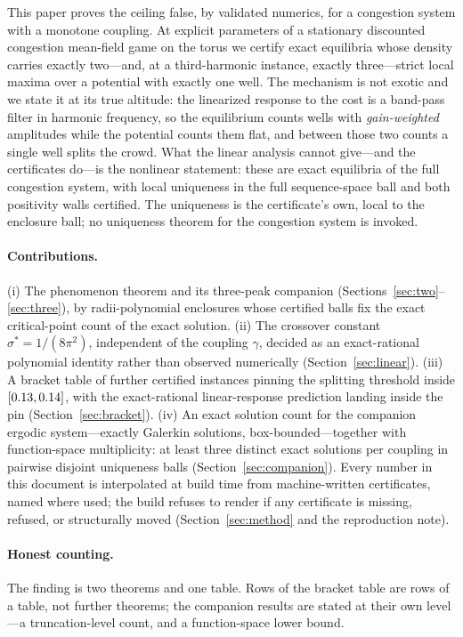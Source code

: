 \documentclass[11pt]{article}
\begin{document}
This paper proves the ceiling false, by validated numerics, for a congestion
system with a monotone coupling. At explicit parameters of a stationary
discounted congestion mean-field game on the torus we certify exact equilibria
whose density carries exactly two---and, at a third-harmonic instance, exactly
three---strict local maxima over a potential with exactly one well. The
mechanism is not exotic and we state it at its true altitude: the linearized
response to the cost is a band-pass filter in harmonic frequency, so the
equilibrium counts wells with \emph{gain-weighted} amplitudes while the
potential counts them flat, and between those two counts a single well splits
the crowd. What the linear analysis cannot give---and the certificates do---is
the nonlinear statement: these are exact equilibria of the full congestion
system, with local uniqueness in the full sequence-space ball and both
positivity walls certified. The uniqueness is the certificate's own, local to
the enclosure ball; no uniqueness theorem for the congestion system is invoked.

\paragraph{Contributions.}
(i) The phenomenon theorem and its three-peak companion
(Sections~\ref{sec:two}--\ref{sec:three}), by radii-polynomial enclosures whose
certified balls fix the exact critical-point count of the exact solution.
(ii) The crossover constant $\sigma^*=1/(8\pi^2)$, independent of the coupling
$\gamma$, decided as an exact-rational polynomial identity rather than observed
numerically (Section~\ref{sec:linear}). (iii) A bracket table of
\NumBracketRows{} further certified instances pinning the splitting threshold
inside $[0.13,0.14]$, with the exact-rational linear-response prediction
landing inside the pin (Section~\ref{sec:bracket}). (iv) An exact solution
count for the companion ergodic system---exactly \CensusCount{} Galerkin
solutions, box-bounded---together with function-space multiplicity: at least
three distinct exact solutions per coupling in pairwise disjoint uniqueness
balls (Section~\ref{sec:companion}). Every number in this document is
interpolated at build time from machine-written certificates, named where
used; the build refuses to render if any certificate is missing, refused, or
structurally moved (Section~\ref{sec:method} and the reproduction note).

\paragraph{Honest counting.}
The finding is two theorems and one table. Rows of the bracket table are rows
of a table, not further theorems; the companion results are stated at their
own level---a truncation-level count, and a function-space lower bound.
\end{document}

